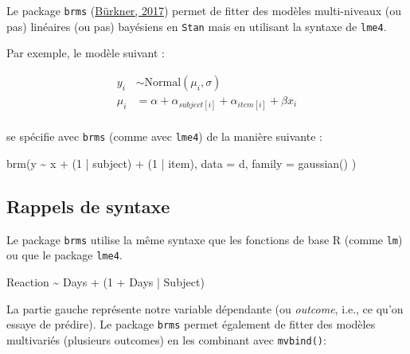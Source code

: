 \documentclass[
  a4paper,11pt,twoside,onecolumn,openright,final,oldfontcommands]{memoir}
\newenvironment{Shaded}{\begin{snugshade}}{\end{snugshade}}
\newcommand{\AttributeTok}[1]{\textcolor[rgb]{0.77,0.63,0.00}{#1}}
\newcommand{\DecValTok}[1]{\textcolor[rgb]{0.00,0.00,0.81}{#1}}
\newcommand{\FunctionTok}[1]{\textcolor[rgb]{0.00,0.00,0.00}{#1}}
\newcommand{\NormalTok}[1]{#1}
\newcommand{\SpecialCharTok}[1]{\textcolor[rgb]{0.00,0.00,0.00}{#1}}
\theoremstyle{definition}
\theoremstyle{definition}
\theoremstyle{definition}
\theoremstyle{definition}
\theoremstyle{remark}
\begin{document}
Le package \texttt{brms} (\href{https://www.jstatsoft.org/article/view/v080i01}{Bürkner, 2017}) permet de fitter des modèles multi-niveaux (ou pas) linéaires (ou pas) bayésiens en \texttt{Stan} mais en utilisant la syntaxe de \texttt{lme4}.

Par exemple, le modèle suivant :

\[
\begin{aligned}
y_{i} &\sim \mathrm{Normal}(\mu_{i}, \sigma) \\
\mu_{i} &= \alpha + \alpha_{subject[i]} + \alpha_{item[i]} + \beta x_{i} \\
\end{aligned}
\]

se spécifie avec \texttt{brms} (comme avec \texttt{lme4}) de la manière suivante :

\begin{Shaded}
\begin{Highlighting}[]
\FunctionTok{brm}\NormalTok{(y }\SpecialCharTok{\textasciitilde{}}\NormalTok{ x }\SpecialCharTok{+}\NormalTok{ (}\DecValTok{1} \SpecialCharTok{|}\NormalTok{ subject) }\SpecialCharTok{+}\NormalTok{ (}\DecValTok{1} \SpecialCharTok{|}\NormalTok{ item), }\AttributeTok{data =}\NormalTok{ d, }\AttributeTok{family =} \FunctionTok{gaussian}\NormalTok{() )}
\end{Highlighting}
\end{Shaded}

\hypertarget{rappels-de-syntaxe}{%
\subsection{Rappels de syntaxe}\label{rappels-de-syntaxe}}

Le package \texttt{brms} utilise la même syntaxe que les fonctions de base R (comme \texttt{lm}) ou que le package \texttt{lme4}.

\begin{Shaded}
\begin{Highlighting}[]
\NormalTok{Reaction }\SpecialCharTok{\textasciitilde{}}\NormalTok{ Days }\SpecialCharTok{+}\NormalTok{ (}\DecValTok{1} \SpecialCharTok{+}\NormalTok{ Days }\SpecialCharTok{|}\NormalTok{ Subject)}
\end{Highlighting}
\end{Shaded}

La partie gauche représente notre variable dépendante (ou \emph{outcome}, i.e., ce qu'on essaye de prédire). Le package \texttt{brms} permet également de fitter des modèles multivariés (plusieurs outcomes) en les combinant avec \texttt{mvbind()}:
\end{document}
